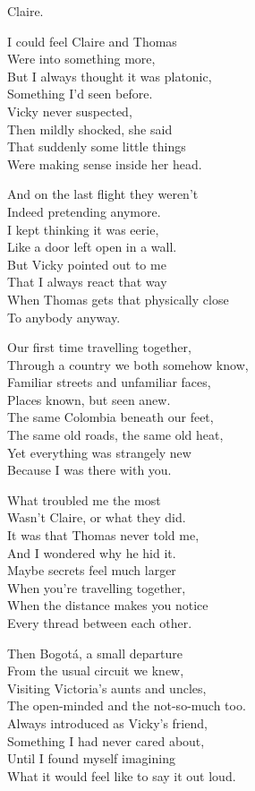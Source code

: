 \begin{lyrics}
 Claire.

I could feel Claire and Thomas\\
Were into something more,\\
But I always thought it was platonic,\\
Something I'd seen before.\\
Vicky never suspected,\\
Then mildly shocked, she said\\
That suddenly some little things\\
Were making sense inside her head.

And on the last flight they weren't\\
Indeed pretending anymore.\\
I kept thinking it was eerie,\\
Like a door left open in a wall.\\
But Vicky pointed out to me\\
That I always react that way\\
When Thomas gets that physically close\\
To anybody anyway.

Our first time travelling together,\\
Through a country we both somehow know,\\
Familiar streets and unfamiliar faces,\\
Places known, but seen anew.\\
The same Colombia beneath our feet,\\
The same old roads, the same old heat,\\
Yet everything was strangely new\\
Because I was there with you.

What troubled me the most\\
Wasn't Claire, or what they did.\\
It was that Thomas never told me,\\
And I wondered why he hid it.\\
Maybe secrets feel much larger\\
When you're travelling together,\\
When the distance makes you notice\\
Every thread between each other.

Then Bogotá, a small departure\\
From the usual circuit we knew,\\
Visiting Victoria's aunts and uncles,\\
The open-minded and the not-so-much too.\\
Always introduced as Vicky's friend,\\
Something I had never cared about,\\
Until I found myself imagining\\
What it would feel like to say it out loud.


\end{lyrics}
